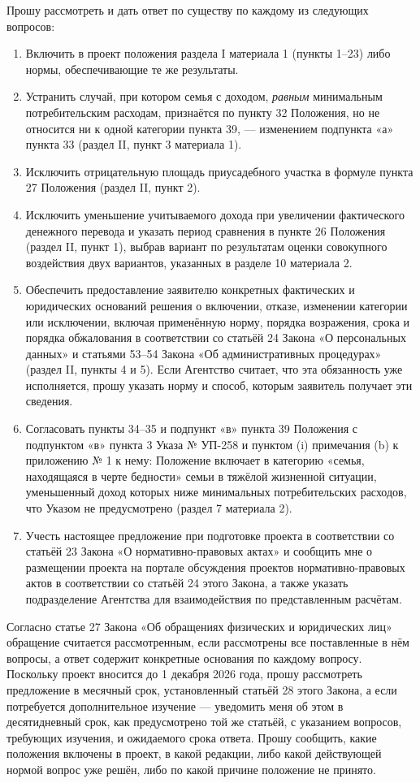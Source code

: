 \documentclass[14pt,a4paper]{extarticle}
\begin{document}
Прошу рассмотреть и дать ответ по существу по каждому из следующих вопросов:
\begin{enumerate}[leftmargin=1.27cm,label=\arabic*.]
\item Включить в проект положения раздела I материала 1 (пункты 1–23) либо нормы, обеспечивающие те же результаты.
\item Устранить случай, при котором семья с доходом, \textit{равным} минимальным потребительским расходам, признаётся по пункту 32 Положения, но не относится ни к одной категории пункта 39, — изменением подпункта «а» пункта 33 (раздел II, пункт 3 материала 1).
\item Исключить отрицательную площадь приусадебного участка в формуле пункта 27 Положения (раздел II, пункт 2).
\item Исключить уменьшение учитываемого дохода при увеличении фактического денежного перевода и указать период сравнения в пункте 26 Положения (раздел II, пункт 1), выбрав вариант по результатам оценки совокупного воздействия двух вариантов, указанных в разделе 10 материала 2.
\item Обеспечить предоставление заявителю конкретных фактических и юридических оснований решения о включении, отказе, изменении категории или исключении, включая применённую норму, порядка возражения, срока и порядка обжалования в соответствии со статьёй 24 Закона «О персональных данных» и статьями 53–54 Закона «Об административных процедурах» (раздел II, пункты 4 и 5). Если Агентство считает, что эта обязанность уже исполняется, прошу указать норму и способ, которым заявитель получает эти сведения.
\item Согласовать пункты 34–35 и подпункт «в» пункта 39 Положения с подпунктом «в» пункта 3 Указа № УП-258 и пунктом (i) примечания (b) к приложению № 1 к нему: Положение включает в категорию «семья, находящаяся в черте бедности» семьи в тяжёлой жизненной ситуации, уменьшенный доход которых ниже минимальных потребительских расходов, что Указом не предусмотрено (раздел 7 материала 2).
\item Учесть настоящее предложение при подготовке проекта в соответствии со статьёй 23 Закона «О нормативно-правовых актах» и сообщить мне о размещении проекта на портале обсуждения проектов нормативно-правовых актов в соответствии со статьёй 24 этого Закона, а также указать подразделение Агентства для взаимодействия по представленным расчётам.
\end{enumerate}

Согласно статье 27 Закона «Об обращениях физических и юридических лиц» обращение считается рассмотренным, если рассмотрены все поставленные в нём вопросы, а ответ содержит конкретные основания по каждому вопросу. Поскольку проект вносится до 1 декабря 2026 года, прошу рассмотреть предложение в месячный срок, установленный статьёй 28 этого Закона, а если потребуется дополнительное изучение — уведомить меня об этом в десятидневный срок, как предусмотрено той же статьёй, с указанием вопросов, требующих изучения, и ожидаемого срока ответа. Прошу сообщить, какие положения включены в проект, в какой редакции, либо какой действующей нормой вопрос уже решён, либо по какой причине положение не принято.
\end{document}
